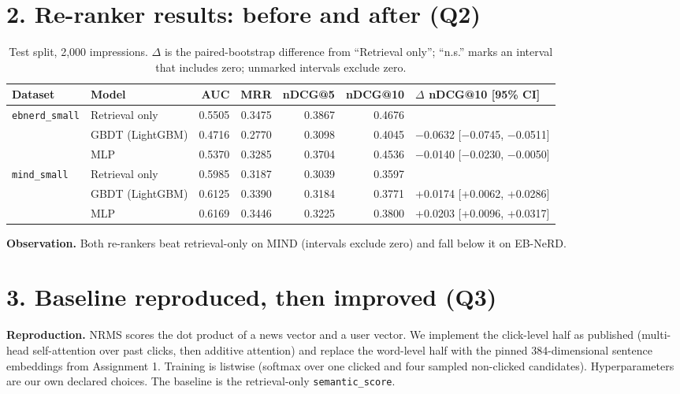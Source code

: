\documentclass[11pt,a4paper]{article}
\begin{document}
\section*{2. Re-ranker results: before and after (Q2)}

\begin{table}[H]
\centering\footnotesize\setlength{\tabcolsep}{4pt}
\begin{tabular}{llrrrrl}
\toprule
\textbf{Dataset} & \textbf{Model} & \textbf{AUC} & \textbf{MRR} & \textbf{nDCG@5} & \textbf{nDCG@10} & \textbf{$\Delta$ nDCG@10 [95\% CI]} \\
\midrule
\texttt{ebnerd\_small} & Retrieval only & 0.5505 & 0.3475 & 0.3867 & 0.4676 &  \\
 & GBDT (LightGBM) & 0.4716 & 0.2770 & 0.3098 & 0.4045 & $-$0.0632 [$-$0.0745, $-$0.0511] \\
 & MLP & 0.5370 & 0.3285 & 0.3704 & 0.4536 & $-$0.0140 [$-$0.0230, $-$0.0050] \\
\midrule
\texttt{mind\_small} & Retrieval only & 0.5985 & 0.3187 & 0.3039 & 0.3597 &  \\
 & GBDT (LightGBM) & 0.6125 & 0.3390 & 0.3184 & 0.3771 & +0.0174 [+0.0062, +0.0286] \\
 & MLP & 0.6169 & 0.3446 & 0.3225 & 0.3800 & +0.0203 [+0.0096, +0.0317] \\
\bottomrule
\end{tabular}
\caption{Test split, 2{,}000 impressions. $\Delta$ is the paired-bootstrap difference from ``Retrieval only''; ``n.s.'' marks an interval that includes zero; unmarked intervals exclude zero.}
\end{table}

\textbf{Observation.} Both re-rankers beat retrieval-only on MIND (intervals exclude zero) and fall below it on EB-NeRD.

\section*{3. Baseline reproduced, then improved (Q3)}

\textbf{Reproduction.} NRMS scores the dot product of a news vector and a user vector. We implement the click-level half as published (multi-head self-attention over past clicks, then additive attention) and replace the word-level half with the pinned 384-dimensional sentence embeddings from Assignment 1. Training is listwise (softmax over one clicked and four sampled non-clicked candidates). Hyperparameters are our own declared choices. The baseline is the retrieval-only \texttt{semantic\_score}.
\end{document}
